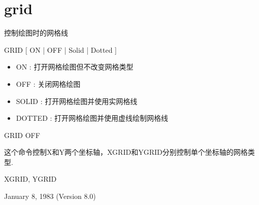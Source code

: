 \section{grid}
\label{cmd:grid}

控制绘图时的网格线

GRID [ ON | OFF | Solid | Dotted ]

\begin{itemize}
\item ON : 打开网格绘图但不改变网格类型
\item OFF : 关闭网格绘图 
\item SOLID : 打开网格绘图并使用实网格线 
\item DOTTED : 打开网格绘图并使用虚线绘制网格线 
\end{itemize}

GRID OFF

这个命令控制X和Y两个坐标轴，XGRID和YGRID分别控制单个坐标轴的网格类型.

XGRID, YGRID

January 8, 1983 (Version 8.0)
